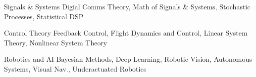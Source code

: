

\begin{cvskills}

  \cvskill
    {Signals \& Systems} %
    {Digial Comms Theory, Math of Signals \& Systems, Stochastic Processes, Statistical DSP} %

  \cvskill
    {Control Theory} %
    {Feedback Control, Flight Dynamics and Control, Linear System Theory, Nonlinear System Theory} %

  \cvskill
    {Robotics and AI} %
    {Bayesian Methods, Deep Learning, Robotic Vision, Autonomous Systems, Visual Nav., Underactuated Robotics} %

\end{cvskills}
